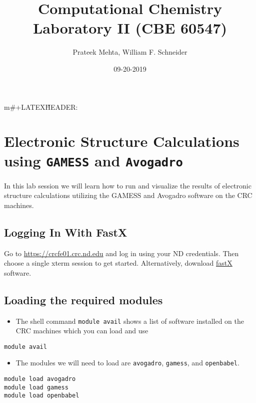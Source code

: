 \documentclass[11pt]{article}
\author{Prateek Mehta, William F. Schneider}
\date{09-20-2019}
\title{Computational Chemistry Laboratory II (CBE 60547)}
\begin{document}
m\#+LATEX\~HEADER: \usepackage{enumerate}
\maketitle

\section{Electronic Structure Calculations using \texttt{GAMESS} and \texttt{Avogadro}}
\label{sec:org4b99ce4}

In this lab session we will learn how to run and visualize the results of electronic structure calculations utilizing the GAMESS and Avogadro software on the CRC machines.

\subsection{Logging In With FastX}
\label{sec:org99eecc9}
Go to \url{https://crcfe01.crc.nd.edu} and log in using your ND credentials.  Then
choose a single xterm session to get started.  Alternatively, download \href{https://www.starnet.com/fastx/current-client}{fastX} software.

\subsection{Loading the required modules}
\label{sec:org8f79cbe}

\begin{itemize}
\item The shell command \texttt{module avail} shows a list of software installed on the CRC machines which you can load and use
\end{itemize}

\begin{verbatim}
module avail
\end{verbatim}


\begin{itemize}
\item The modules we will need to load are \texttt{avogadro}, \texttt{gamess}, and \texttt{openbabel}.
\end{itemize}

\begin{verbatim}
module load avogadro
module load gamess
module load openbabel
\end{verbatim}
\end{document}
